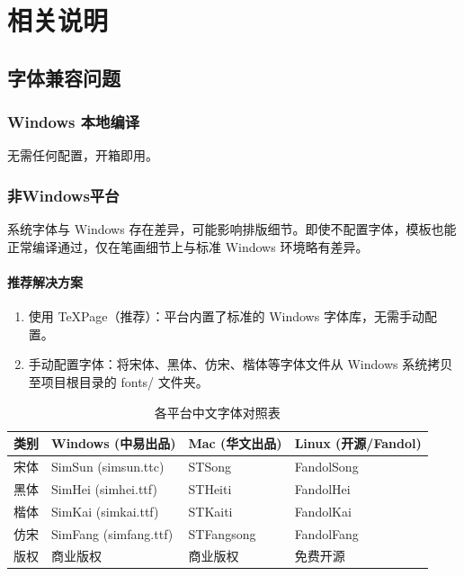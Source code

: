 
\chapter{相关说明}

\section{字体兼容问题}

\subsection{Windows 本地编译}

无需任何配置，开箱即用。

\subsection{非Windows平台}

系统字体与 Windows 存在差异，可能影响排版细节。即使不配置字体，模板也能正常编译通过，仅在笔画细节上与标准 Windows 环境略有差异。

\subsubsection{推荐解决方案}

\begin{enumerate}
    \item 使用 TeXPage（推荐）：平台内置了标准的 Windows 字体库，无需手动配置。
    \item 手动配置字体：将宋体、黑体、仿宋、楷体等字体文件从 Windows 系统拷贝至项目根目录的 fonts/ 文件夹。
\end{enumerate}

\begin{table}[htbp]
    \centering
    \caption{各平台中文字体对照表}
    \label{tab:fonts}
    \begin{tabular}{llll}
        \toprule
        类别 & Windows (中易出品) & Mac (华文出品) & Linux (开源/Fandol) \\
        \midrule
        宋体 & SimSun (simsun.ttc) & STSong & FandolSong \\
        黑体 & SimHei (simhei.ttf) & STHeiti & FandolHei \\
        楷体 & SimKai (simkai.ttf) & STKaiti & FandolKai \\
        仿宋 & SimFang (simfang.ttf) & STFangsong & FandolFang \\
        版权 & 商业版权 & 商业版权 & 免费开源 \\
        \bottomrule
    \end{tabular}
\end{table}

